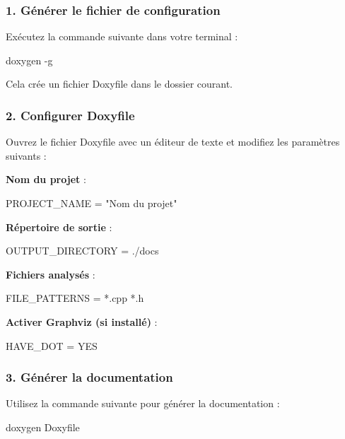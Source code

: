 \subsubsection*{1. Générer le fichier de configuration}

Exécutez la commande suivante dans votre terminal \+: 
\begin{DoxyCode}
doxygen -g
\end{DoxyCode}
 Cela crée un fichier {\ttfamily Doxyfile} dans le dossier courant. 



\subsubsection*{2. Configurer {\ttfamily Doxyfile}}

Ouvrez le fichier {\ttfamily Doxyfile} avec un éditeur de texte et modifiez les paramètres suivants \+:


\begin{DoxyItemize}
\item {\bfseries Nom du projet} \+: 
\begin{DoxyCode}
PROJECT\_NAME = "Nom du projet"
\end{DoxyCode}

\item {\bfseries Répertoire de sortie} \+: 
\begin{DoxyCode}
OUTPUT\_DIRECTORY = ./docs
\end{DoxyCode}

\item {\bfseries Fichiers analysés} \+: 
\begin{DoxyCode}
FILE\_PATTERNS = *.cpp *.h
\end{DoxyCode}

\item {\bfseries Activer Graphviz (si installé)} \+: 
\begin{DoxyCode}
HAVE\_DOT = YES
\end{DoxyCode}
 


\end{DoxyItemize}

\subsubsection*{3. Générer la documentation}

Utilisez la commande suivante pour générer la documentation \+: 
\begin{DoxyCode}
doxygen Doxyfile
\end{DoxyCode}




